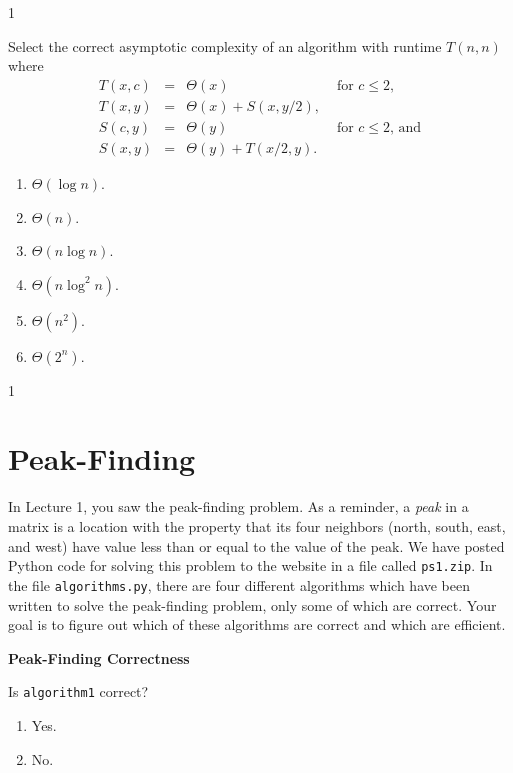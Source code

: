 \documentclass[12pt,twoside]{article}
\begin{document}
\begin{exercises}
\begin{exerciseparts}
\ifsolution \solution{}
1
\fi

\problempart {}
Select the correct asymptotic complexity
of an algorithm with runtime $T(n, n)$
where 
$$
\begin{array}{rcll}
T(x, c) &=& \Theta(x) & \textrm{ for $c \le 2$}, \\
T(x, y) &=& \Theta(x) + S(x, y / 2), \\
S(c, y) &=& \Theta(y) & \textrm{ for $c \le 2$, and} \\
S(x, y) &=& \Theta(y) + T(x / 2, y).
\end{array}
$$

\begin{enumerate}
\item $\Theta(\log n)$.
\item $\Theta(n)$.
\item $\Theta(n \log n)$.
\item $\Theta(n \log^2 n)$.
\item $\Theta(n^2)$.
\item $\Theta(2^n)$.
\end{enumerate}

\ifsolution \solution{}
1
\fi

\end{exerciseparts}

\section*{Peak-Finding}

In Lecture 1,
you saw the peak-finding problem.
As a reminder,
a \emph{peak} in a matrix
is a location with the property that its four neighbors
(north, south, east, and west)
have value less than or equal to the value of the peak.
We have posted Python code for solving this problem
to the website in a file called \texttt{ps1.zip}.
In the file \texttt{algorithms.py},
there are four different algorithms
which have been written
to solve the peak-finding problem,
only some of which are correct.
Your goal is to figure out
which of these algorithms are correct
and which are efficient.

\problem {} \textbf{Peak-Finding Correctness}

\begin{problemparts}

\problempart {} Is \texttt{algorithm1} correct?
\begin{enumerate}
\item Yes.
\item No.
\end{enumerate}


\end{problemparts}
\end{exercises}
\end{document}

